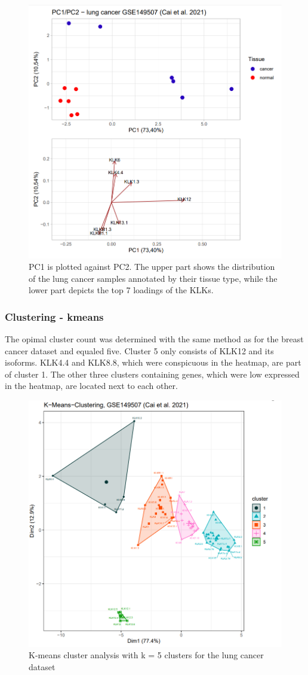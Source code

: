 \documentclass[
]{article}
\begin{document}
\begin{figure}

{\centering \includegraphics[width=0.5\linewidth]{images/PCAplot_lung} 

}

\caption{PC1 is plotted against PC2. The upper part shows the distribution of the lung cancer samples annotated by their tissue type, while the lower part depicts the top 7 loadings of the KLKs.}\label{fig:PCA plot - lung }
\end{figure}

\hypertarget{clustering---kmeans}{%
\subsubsection{Clustering - kmeans}\label{clustering---kmeans}}

The opimal cluster count was determined with the same method as for the
breast cancer dataset and equaled five. Cluster 5 only consists of KLK12
and its isoforms. KLK4.4 and KLK8.8, which were conspicuous in the
heatmap, are part of cluster 1. The other three clusters containing
genes, which were low expressed in the heatmap, are located next to each
other.

\begin{figure}

{\centering \includegraphics[width=0.5\linewidth]{images/kmeans_5_lung} 

}

\caption{K-means cluster analysis with k = 5 clusters for the lung cancer dataset}\label{fig:K-means plot - lung }
\end{figure}
\end{document}
